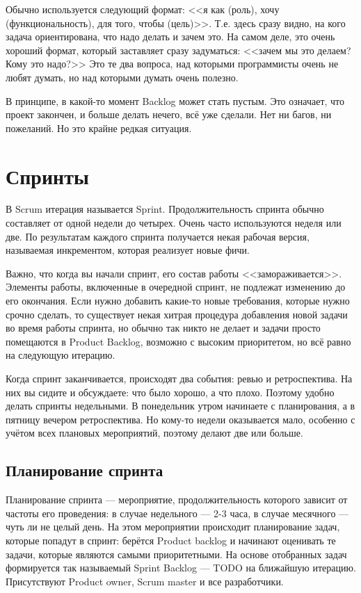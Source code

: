 \documentclass{../../text-style}
\begin{document}
Обычно используется следующий формат: <<я как (роль), хочу (функциональность), для того, чтобы (цель)>>. Т.е. здесь сразу видно, на кого задача ориентирована, что надо делать и зачем это. На самом деле, это очень хороший формат, который заставляет сразу задуматься: <<зачем мы это делаем? Кому это надо?>> Это те два вопроса, над которыми программисты очень не любят думать, но над которыми думать очень полезно.

В принципе, в какой-то момент Backlog может стать пустым. Это означает, что проект закончен, и больше делать нечего, всё уже сделали. Нет ни багов, ни пожеланий. Но это крайне редкая ситуация.

\section{Спринты}

В Scrum итерация называется Sprint. Продолжительность спринта обычно составляет от одной недели до четырех. Очень часто используются неделя или две. По результатам каждого спринта получается некая рабочая версия, называемая инкрементом, которая реализует новые фичи.

Важно, что когда вы начали спринт, его состав работы <<замораживается>>. Элементы работы, включенные в очередной спринт, не подлежат изменению до его окончания. Если нужно добавить какие-то новые требования, которые нужно срочно сделать, то существует некая хитрая процедура добавления новой задачи во время работы спринта, но обычно так никто не делает и задачи просто помещаются в Product Backlog, возможно с высоким приоритетом, но всё равно на следующую итерацию.

Когда спринт заканчивается, происходят два события: ревью и ретроспектива. На них вы сидите и обсуждаете: что было хорошо, а что плохо. Поэтому удобно делать спринты недельными. В понедельник утром начинаете с планирования, а в пятницу вечером ретроспектива. Но кому-то недели оказывается мало, особенно с учётом всех плановых мероприятий, поэтому делают две или больше.

\subsection{Планирование спринта}

Планирование спринта --- мероприятие, продолжительность которого зависит от частоты его проведения: в случае недельного --- 2-3 часа, в случае месячного --- чуть ли не целый день. На этом мероприятии происходит планирование задач, которые попадут в спринт: берётся Product backlog и начинают оценивать те задачи, которые являются самыми приоритетными. На основе отобранных задач формируется так называемый Sprint Backlog --- TODO на ближайшую итерацию. Присутствуют Product owner, Scrum master и все разработчики.
\end{document}
